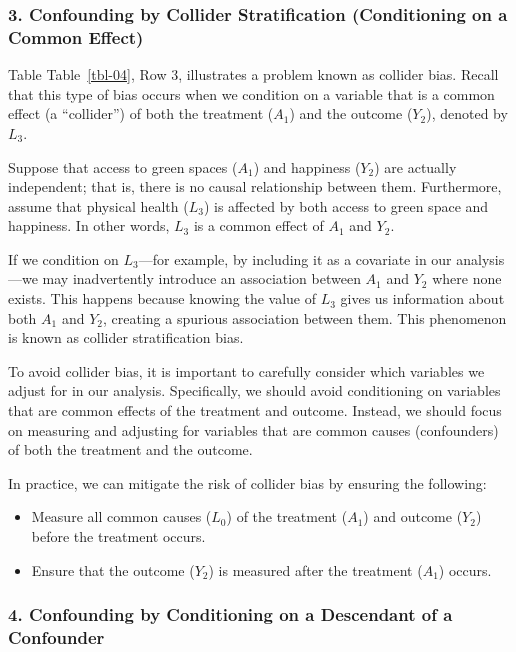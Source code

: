 \documentclass[
  singlecolumn]{article}
\providecommand{\tightlist}{%
  \setlength{\itemsep}{0pt}\setlength{\parskip}{0pt}}\usepackage{longtable,booktabs,array}
\begin{document}
\subsubsection{3. Confounding by Collider Stratification (Conditioning
on a Common
Effect)}\label{confounding-by-collider-stratification-conditioning-on-a-common-effect}

Table Table~\ref{tbl-04}, Row 3, illustrates a problem known as collider
bias. Recall that this type of bias occurs when we condition on a
variable that is a common effect (a ``collider'') of both the treatment
(\(A_1\)) and the outcome (\(Y_2\)), denoted by \(L_3\).

Suppose that access to green spaces (\(A_1\)) and happiness (\(Y_2\))
are actually independent; that is, there is no causal relationship
between them. Furthermore, assume that physical health (\(L_3\)) is
affected by both access to green space and happiness. In other words,
\(L_3\) is a common effect of \(A_1\) and \(Y_2\).

If we condition on \(L_3\)---for example, by including it as a covariate
in our analysis---we may inadvertently introduce an association between
\(A_1\) and \(Y_2\) where none exists. This happens because knowing the
value of \(L_3\) gives us information about both \(A_1\) and \(Y_2\),
creating a spurious association between them. This phenomenon is known
as collider stratification bias.

To avoid collider bias, it is important to carefully consider which
variables we adjust for in our analysis. Specifically, we should avoid
conditioning on variables that are common effects of the treatment and
outcome. Instead, we should focus on measuring and adjusting for
variables that are common causes (confounders) of both the treatment and
the outcome.

In practice, we can mitigate the risk of collider bias by ensuring the
following:

\begin{itemize}
\tightlist
\item
  Measure all common causes (\(L_0\)) of the treatment (\(A_1\)) and
  outcome (\(Y_2\)) before the treatment occurs.
\item
  Ensure that the outcome (\(Y_2\)) is measured after the treatment
  (\(A_1\)) occurs.
\end{itemize}

\subsubsection{4. Confounding by Conditioning on a Descendant of a
Confounder}\label{confounding-by-conditioning-on-a-descendant-of-a-confounder}
\end{document}

